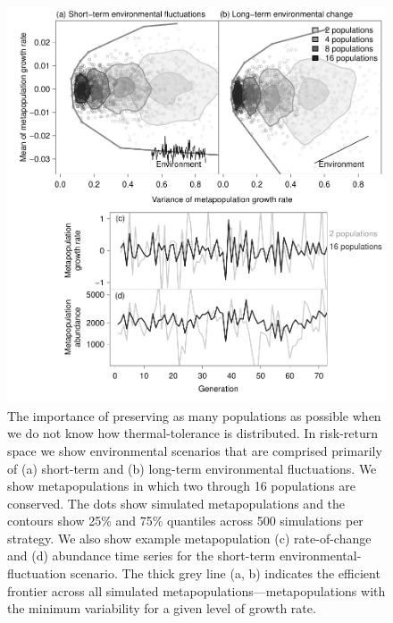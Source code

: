 \begin{figure}[htbp]
\centering
\includegraphics[width=4.5in]{metafolio/Fig5}
\caption[The importance of preserving as many populations as possible when we do not know how thermal-tolerance is distributed.]{The importance of preserving as many populations as possible when we do not know how thermal-tolerance is distributed. In risk-return space we show environmental scenarios that are comprised primarily of (a) short-term and (b) long-term environmental fluctuations. We show metapopulations in which two through 16 populations are conserved. The dots show simulated metapopulations and the contours show 25\% and 75\% quantiles across 500 simulations per strategy. We also show example metapopulation (c) rate-of-change and (d) abundance time series for the short-term environmental-fluctuation scenario. The thick grey line (a, b) indicates the efficient frontier across all simulated metapopulations---metapopulations with the minimum variability for a given level of growth rate.} \label{f:n}
\end{figure}

\clearpage

